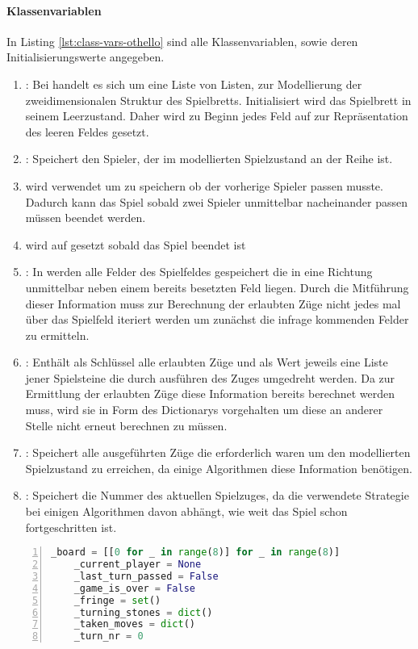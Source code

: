 \paragraph{Klassenvariablen}
In Listing \ref{lst:class-vars-othello} sind alle Klassenvariablen, sowie deren Initialisierungswerte angegeben.
\begin{enumerate}
\item {}: Bei  handelt es sich um eine Liste von Listen, zur Modellierung der zweidimensionalen Struktur des Spielbretts. Initialisiert wird das Spielbrett in seinem Leerzustand. Daher wird zu Beginn jedes Feld auf  zur Repräsentation des leeren Feldes gesetzt.
\item {}: Speichert den Spieler, der im modellierten Spielzustand an der Reihe ist.
\item {} wird verwendet um zu speichern ob der vorherige Spieler  passen musste. Dadurch kann das Spiel sobald zwei Spieler unmittelbar nacheinander passen müssen beendet werden.
\item {} wird auf  gesetzt sobald das Spiel beendet ist
\item {}: In  werden alle Felder des Spielfeldes gespeichert die in eine Richtung unmittelbar neben einem bereits besetzten Feld liegen. Durch die Mitführung dieser Information muss zur Berechnung der erlaubten Züge nicht jedes mal über das Spielfeld iteriert werden um zunächst die infrage kommenden Felder zu ermitteln.
\item {}: Enthält als Schlüssel alle erlaubten Züge und als Wert jeweils eine Liste jener Spielsteine die durch ausführen des Zuges umgedreht werden. Da zur Ermittlung der erlaubten Züge diese Information bereits berechnet werden muss, wird sie in Form des Dictionarys vorgehalten um diese an anderer Stelle nicht erneut berechnen zu müssen.
\item {}: Speichert alle ausgeführten Züge die erforderlich waren um den modellierten Spielzustand zu erreichen, da einige Algorithmen diese Information benötigen.
\item {}: Speichert die Nummer des aktuellen Spielzuges, da die verwendete Strategie bei einigen Algorithmen davon abhängt, wie weit das Spiel schon fortgeschritten ist.
\end{enumerate}
\begin{lstlisting}[basicstyle=\footnotesize, caption = {Klassenvariablen der Klasse \mxZitat{Othello}}, language = python, captionpos = t , numbers=left, label={lst:class-vars-othello}]
    _board = [[0 for _ in range(8)] for _ in range(8)]
    _current_player = None 
    _last_turn_passed = False
    _game_is_over = False
    _fringe = set()
    _turning_stones = dict()    
    _taken_moves = dict()
    _turn_nr = 0
\end{lstlisting}
